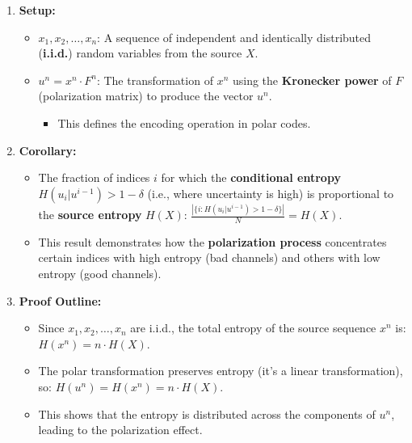 \documentclass[11pt]{article}
\providecommand{\tightlist}{%
      \setlength{\itemsep}{0pt}\setlength{\parskip}{0pt}}
\begin{document}
\begin{enumerate}
\def\labelenumi{\arabic{enumi}.}
\tightlist
\item
  \textbf{Setup:}

  \begin{itemize}
  \tightlist
  \item
    \(x_1, x_2, \dots, x_n\): A sequence of independent and identically
    distributed (\textbf{i.i.d.}) random variables from the source
    \(X\).
  \item
    \(u^n = x^n \cdot F^n\): The transformation of \(x^n\) using the
    \textbf{Kronecker power} of \(F\) (polarization matrix) to produce
    the vector \(u^n\).

    \begin{itemize}
    \tightlist
    \item
      This defines the encoding operation in polar codes.
    \end{itemize}
  \end{itemize}
\item
  \textbf{Corollary:}

  \begin{itemize}
  \tightlist
  \item
    The fraction of indices \(i\) for which the \textbf{conditional
    entropy} \(H(u_i | u^{i-1}) > 1 - \delta\) (i.e., where uncertainty
    is high) is proportional to the \textbf{source entropy} \(H(X)\):
    \(\frac{\left| \{ i : H(u_i | u^{i-1}) > 1 - \delta \} \right|}{N} = H(X).\)
  \item
    This result demonstrates how the \textbf{polarization process}
    concentrates certain indices with high entropy (bad channels) and
    others with low entropy (good channels).
  \end{itemize}
\item
  \textbf{Proof Outline:}

  \begin{itemize}
  \tightlist
  \item
    Since \(x_1, x_2, \dots, x_n\) are i.i.d., the total entropy of the
    source sequence \(x^n\) is: \(H(x^n) = n \cdot H(X).\)
  \item
    The polar transformation preserves entropy (it's a linear
    transformation), so: \(H(u^n) = H(x^n) = n \cdot H(X).\)
  \item
    This shows that the entropy is distributed across the components of
    \(u^n\), leading to the polarization effect.
  \end{itemize}
\end{enumerate}
\end{document}
